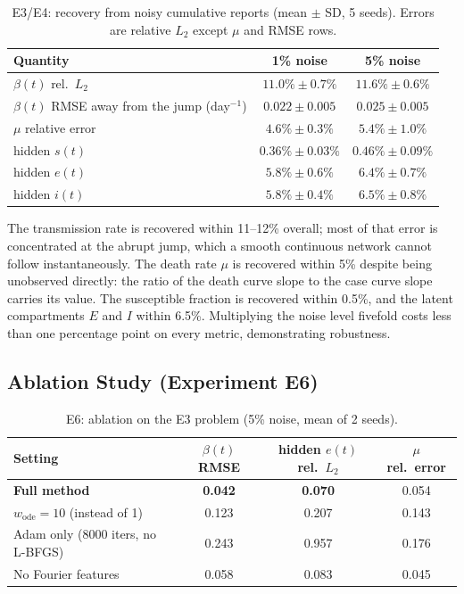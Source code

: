 \documentclass[11pt,a4paper]{article}
\theoremstyle{remark}
\begin{document}
\begin{table}[h]
\centering
\caption{E3/E4: recovery from noisy cumulative reports (mean $\pm$ SD, 5 seeds).
Errors are relative $L_2$ except $\mu$ and RMSE rows.}
\label{tab:e3e4}
\begin{tabular}{lcc}
\toprule
Quantity & 1\% noise & 5\% noise \\
\midrule
$\beta(t)$ rel.\ $L_2$                            & $11.0\%\pm0.7\%$   & $11.6\%\pm0.6\%$   \\
$\beta(t)$ RMSE away from the jump (day$^{-1}$)   & $0.022\pm0.005$    & $0.025\pm0.005$    \\
$\mu$ relative error                              & $4.6\%\pm0.3\%$    & $5.4\%\pm1.0\%$    \\
hidden $s(t)$                                     & $0.36\%\pm0.03\%$  & $0.46\%\pm0.09\%$  \\
hidden $e(t)$                                     & $5.8\%\pm0.6\%$    & $6.4\%\pm0.7\%$    \\
hidden $i(t)$                                     & $5.8\%\pm0.4\%$    & $6.5\%\pm0.8\%$    \\
\bottomrule
\end{tabular}
\end{table}

The transmission rate is recovered within 11--12\% overall; most of that
error is concentrated at the abrupt jump, which a smooth continuous network
cannot follow instantaneously.  The death rate $\mu$ is recovered within 5\%
despite being unobserved directly: the ratio of the death curve slope to the
case curve slope carries its value.  The susceptible fraction is recovered
within 0.5\%, and the latent compartments $E$ and $I$ within 6.5\%.
Multiplying the noise level fivefold costs less than one percentage point on
every metric, demonstrating robustness.

\subsection{Ablation Study (Experiment E6)}
\label{sec:ablation}

\begin{table}[h]
\centering
\caption{E6: ablation on the E3 problem (5\% noise, mean of 2 seeds).}
\label{tab:e6}
\begin{tabular}{lccc}
\toprule
Setting & $\beta(t)$ RMSE & hidden $e(t)$ rel.\ $L_2$ & $\mu$ rel.\ error \\
\midrule
\textbf{Full method}                            & \textbf{0.042} & \textbf{0.070} & 0.054 \\
$w_{\text{ode}} = 10$ (instead of 1)           & 0.123          & 0.207          & 0.143 \\
Adam only (8000 iters, no L-BFGS)              & 0.243          & 0.957          & 0.176 \\
No Fourier features                             & 0.058          & 0.083          & 0.045 \\
\bottomrule
\end{tabular}
\end{table}
\end{document}
